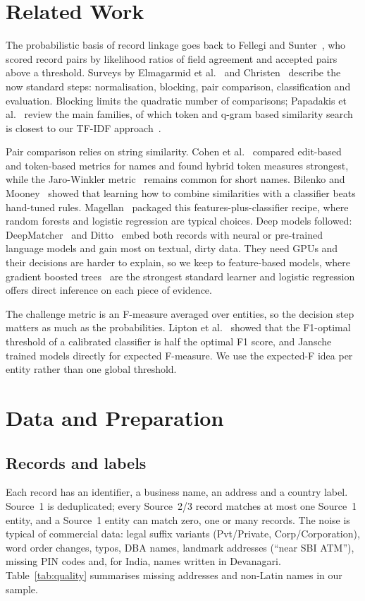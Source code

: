 \section{Related Work}
The probabilistic basis of record linkage goes back to Fellegi and Sunter~\cite{fellegi1969}, who scored record pairs
by likelihood ratios of field agreement and accepted pairs above a threshold. Surveys by Elmagarmid
et al.~\cite{elmagarmid2007} and Christen~\cite{christen2012} describe the now standard steps: normalisation,
blocking, pair comparison, classification and evaluation. Blocking limits the quadratic number of comparisons;
Papadakis et al.~\cite{papadakis2020} review the main families, of which token and q-gram based similarity search
is closest to our TF-IDF approach~\cite{salton1988}.

Pair comparison relies on string similarity. Cohen et al.~\cite{cohen2003} compared edit-based and token-based
metrics for names and found hybrid token measures strongest, while the Jaro-Winkler metric~\cite{winkler1990}
remains common for short names. Bilenko and Mooney~\cite{bilenko2003} showed that learning how to combine
similarities with a classifier beats hand-tuned rules. Magellan~\cite{konda2016} packaged this
features-plus-classifier recipe, where random forests and logistic regression are typical choices. Deep models
followed: DeepMatcher~\cite{mudgal2018} and Ditto~\cite{li2020ditto} embed both records with neural or
pre-trained language models and gain most on textual, dirty data. They need GPUs and their decisions are harder to
explain, so we keep to feature-based models, where gradient boosted trees~\cite{friedman2001,ke2017} are the strongest
standard learner and logistic regression~\cite{hosmer2013} offers direct inference on each piece of evidence.

The challenge metric is an F-measure averaged over entities, so the decision step matters as much as the
probabilities. Lipton et al.~\cite{lipton2014} showed that the F1-optimal threshold of a calibrated classifier is
half the optimal F1 score, and Jansche~\cite{jansche2005} trained models directly for expected F-measure.
We use the expected-F idea per entity rather than one global threshold.

\section{Data and Preparation}
\subsection{Records and labels}
Each record has an identifier, a business name, an address and a country label. Source~1 is deduplicated; every
Source~2/3 record matches at most one Source~1 entity, and a Source~1 entity can match zero, one or many records.
The noise is typical of commercial data: legal suffix variants (Pvt/Private, Corp/Corporation), word order changes,
typos, DBA names, landmark addresses (``near SBI ATM''), missing PIN codes and, for India, names written in
Devanagari. Table~\ref{tab:quality} summarises missing addresses and non-Latin names in our sample.


